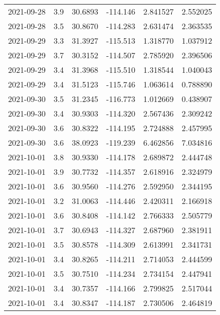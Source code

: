 \begin{tabular}{lrrrrr}
2021-09-28 &       3.9 &  30.6893 &  -114.146 &         2.841527 &         2.552025 \\
2021-09-28 &       3.5 &  30.8670 &  -114.283 &         2.631474 &         2.363535 \\
2021-09-29 &       3.3 &  31.3927 &  -115.513 &         1.318770 &         1.037912 \\
2021-09-29 &       3.7 &  30.3152 &  -114.507 &         2.785920 &         2.396506 \\
2021-09-29 &       3.4 &  31.3968 &  -115.510 &         1.318544 &         1.040043 \\
2021-09-29 &       3.4 &  31.5123 &  -115.746 &         1.063614 &         0.788890 \\
2021-09-30 &       3.5 &  31.2345 &  -116.773 &         1.012669 &         0.438907 \\
2021-09-30 &       3.4 &  30.9303 &  -114.320 &         2.567436 &         2.309242 \\
2021-09-30 &       3.6 &  30.8322 &  -114.195 &         2.724888 &         2.457995 \\
2021-09-30 &       3.6 &  38.0923 &  -119.239 &         6.462856 &         7.034816 \\
2021-10-01 &       3.8 &  30.9330 &  -114.178 &         2.689872 &         2.444748 \\
2021-10-01 &       3.9 &  30.7732 &  -114.357 &         2.618916 &         2.324979 \\
2021-10-01 &       3.6 &  30.9560 &  -114.276 &         2.592950 &         2.344195 \\
2021-10-01 &       3.2 &  31.0063 &  -114.446 &         2.420311 &         2.166918 \\
2021-10-01 &       3.6 &  30.8408 &  -114.142 &         2.766333 &         2.505779 \\
2021-10-01 &       3.7 &  30.6943 &  -114.327 &         2.687960 &         2.381911 \\
2021-10-01 &       3.5 &  30.8578 &  -114.309 &         2.613991 &         2.341731 \\
2021-10-01 &       3.4 &  30.8265 &  -114.211 &         2.714053 &         2.444599 \\
2021-10-01 &       3.5 &  30.7510 &  -114.234 &         2.734154 &         2.447941 \\
2021-10-01 &       3.4 &  30.7357 &  -114.166 &         2.799825 &         2.517044 \\
2021-10-01 &       3.4 &  30.8347 &  -114.187 &         2.730506 &         2.464819 \\

\end{tabular}
